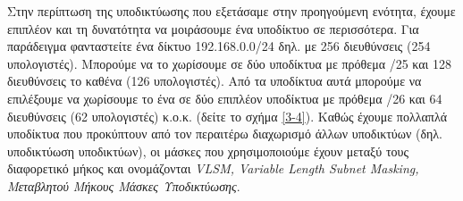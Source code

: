 Στην περίπτωση της υποδικτύωσης που εξετάσαμε στην προηγούμενη ενότητα, έχου\-με επιπλέον και τη δυνατότητα να μοιράσουμε ένα υποδίκτυο σε περισσότερα. Για παράδειγμα φανταστείτε ένα δίκτυο 192.168.0.0/24 δηλ. με 256 διευθύνσεις (254 υπολογιστές). Μπορούμε να το χωρίσουμε σε δύο υποδίκτυα με πρόθεμα /25 και 128 διευθύνσεις το καθένα (126 υπολογιστές). Από τα υποδίκτυα αυτά μπορούμε να επιλέξουμε να χωρίσουμε το ένα σε δύο επιπλέον υποδίκτυα με πρόθεμα /26 και 64 διευθύνσεις (62 υπολογιστές) κ.ο.κ. (δείτε το σχήμα \ref{3-4}). Καθώς έχουμε πολλαπλά υποδίκτυα που προκύπτουν από τον περαιτέρω διαχωρισμό άλλων υποδικτύων (δηλ. υποδικτύωση υποδικτύων), οι μάσκες που χρησιμοποιούμε έχουν μεταξύ τους διαφορετικό μήκος και ονομάζονται \emph{VLSM, Variable Length Subnet Masking, Μεταβλητού Μήκους Μάσκες Υποδικτύωσης}.